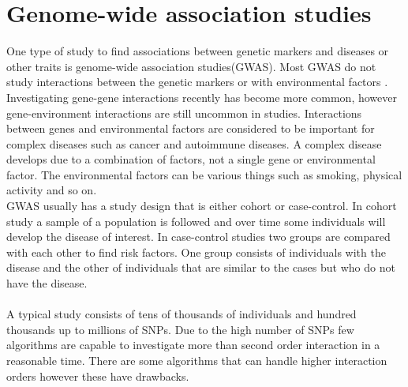 \documentclass[10pt,a4paper]{report}
\begin{document}
\section{Genome-wide association studies}
One type of study to find associations between genetic markers and diseases or other traits is genome-wide association studies(GWAS). Most GWAS do not study interactions between the genetic markers or with environmental factors \cite{cordell_detect_review, gene_enviroment_2013}. Investigating gene-gene interactions recently has become more common\cite{cordell_detect_review}, however gene-environment interactions are still uncommon in studies\cite{gene_enviroment_2013}. Interactions between genes and environmental factors are considered to be important for complex diseases such as cancer and autoimmune diseases\cite{cordell_detect_review, gene_enviroment_2013, geira, ra_smoking}. A complex disease develops due to a combination of factors, not a single gene or environmental factor\cite{rothman1998modern}. The environmental factors can be various things such as smoking, physical activity and so on.
\\
GWAS usually has a study design that is either cohort or case-control\cite{rothman1998modern}. In cohort study a sample of a population is followed and over time some individuals will develop the disease of interest\cite{mann_observational}. In case-control studies two groups are compared with each other to find risk factors\cite{mann_observational}. One group consists of individuals with the disease and the other of individuals that are similar to the cases but who do not have the disease\cite{mann_observational}.\\
\\
\newpage
A typical study consists of tens of thousands of individuals and hundred thousands up to millions of SNPs\cite{cordell_detect_review, burton2007genome}. Due to the high number of SNPs few algorithms are capable to investigate more than second order interaction in a reasonable time. There are some algorithms that can handle higher interaction orders however these have drawbacks\cite{gwis,high_order_2012,fast_high_order_cluster}.
\end{document}
